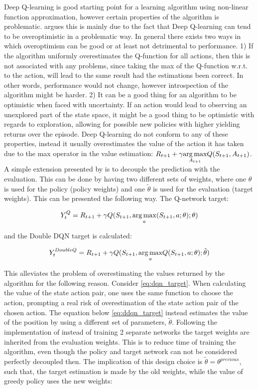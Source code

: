 Deep Q-learning is good starting point for a learning algorithm using non-linear function approximation, however certain properties of the algorithm is problematic. \parencite{van_hasselt_deep_2015} argues this is mainly due to the fact that Deep Q-learning can tend to be overoptimistic in a problematic way. In general there exists two ways in which overoptimism can be good or at least not detrimental to performance. 1) If the algorithm uniformly overestimates the Q-function for all actions, then this is not associated with any problems, since taking the max of the Q-function w.r.t. to the action, will lead to the same result had the estimations been correct. In other words, performance would not change, however introspection of the algorithm might be harder. 2) It can be a good thing for an algorithm to be optimistic when faced with uncertainty. If an action would lead to observing an unexplored part of the state space, it might be a good thing to be optimistic with regards to exploration, allowing for possible new policies with higher yielding returns over the episode. Deep Q-learning do not conform to any of these properties, instead it usually overestimates the value of the action it has taken due to the max operator in the value estimation: $R_{t+1} + \gamma \underset{A_{t+1}}{\operatorname*{arg\,max}} Q(S_{t+1}, A_{t+1})$. A simple extension presented by \textcite{van_hasselt_deep_2015} is to decouple the prediction with the evaluation. This can be done by having two different sets of weights, where one $\theta$ is used for the policy (policy weights) and one $\tilde{\theta}$ is used for the evaluation (target weights). This can be presented the following way. The Q-network target:

\begin{equation}\label{eq:dqn_target}
    Y_t^{Q} = R_{t+1} + \gamma Q(S_{t+1}, \underset{a}{\operatorname*{arg\,max}} (S_{t+1}, a ; \theta) ; \theta)
\end{equation}

and the Double DQN target is calculated:

\begin{equation}\label{eq:ddqn_target}
    Y_t^{DoubleQ} = R_{t+1} + \gamma Q(S_{t+1}, \underset{a}{\operatorname*{arg\,max}}Q(S_{t+1}, a; \theta); \tilde{\theta}) 
\end{equation}

This alleviates the problem of overestimating the values returned by the algorithm for the following reason. Consider \eqref{eq:dqn_target}. When calculating the value of the state action pair, one uses the same function to choose the action, prompting  a real risk of overestimation of the state action pair of the chosen action. The equation below \eqref{eq:ddqn_target} instead estimates the value of the position by using a different set of parameters, $\tilde{\theta}$. Following the implementation of \textcite{van_hasselt_deep_2015} instead of training 2 separate networks the target weights are inherited from the evaluation weights. This is to reduce time of training the algorithm, even though the policy and target network can not be considered perfectly decoupled then. The implication of this design choice is $\tilde{\theta} = \theta^{previous}$, such that, the target estimation is made by the old weights, while the value of greedy policy uses the new weights:

